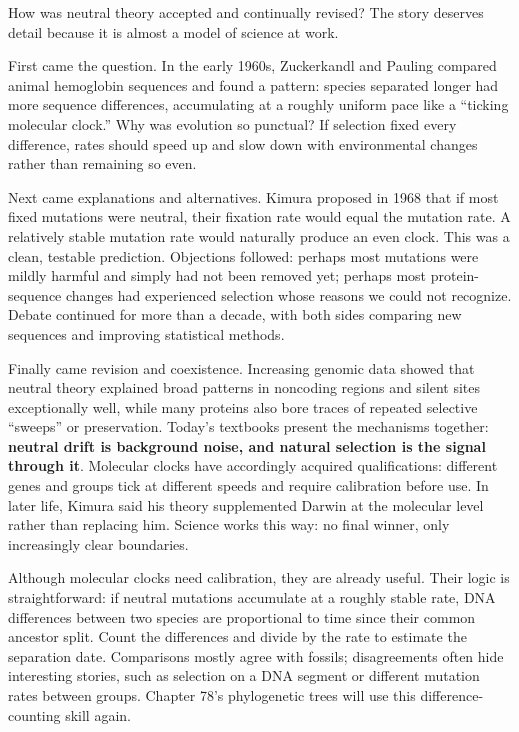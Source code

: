 \begin{zhengju}
How was neutral theory accepted and continually revised? The story deserves detail because it is almost a model of science at work.

First came the question. In the early 1960s, Zuckerkandl and Pauling compared animal hemoglobin sequences and found a pattern: species separated longer had more sequence differences, accumulating at a roughly uniform pace like a ``ticking molecular clock.'' Why was evolution so punctual? If selection fixed every difference, rates should speed up and slow down with environmental changes rather than remaining so even.

Next came explanations and alternatives. Kimura proposed in 1968 that if most fixed mutations were neutral, their fixation rate would equal the mutation rate. A relatively stable mutation rate would naturally produce an even clock. This was a clean, testable prediction. Objections followed: perhaps most mutations were mildly harmful and simply had not been removed yet; perhaps most protein-sequence changes had experienced selection whose reasons we could not recognize. Debate continued for more than a decade, with both sides comparing new sequences and improving statistical methods.

Finally came revision and coexistence. Increasing genomic data showed that neutral theory explained broad patterns in noncoding regions and silent sites exceptionally well, while many proteins also bore traces of repeated selective ``sweeps'' or preservation. Today's textbooks present the mechanisms together: \textbf{neutral drift is background noise, and natural selection is the signal through it}. Molecular clocks have accordingly acquired qualifications: different genes and groups tick at different speeds and require calibration before use. In later life, Kimura said his theory supplemented Darwin at the molecular level rather than replacing him. Science works this way: no final winner, only increasingly clear boundaries.
\end{zhengju}

Although molecular clocks need calibration, they are already useful. Their logic is straightforward: if neutral mutations accumulate at a roughly stable rate, DNA differences between two species are proportional to time since their common ancestor split. Count the differences and divide by the rate to estimate the separation date. Comparisons mostly agree with fossils; disagreements often hide interesting stories, such as selection on a DNA segment or different mutation rates between groups. Chapter 78's phylogenetic trees will use this difference-counting skill again.

